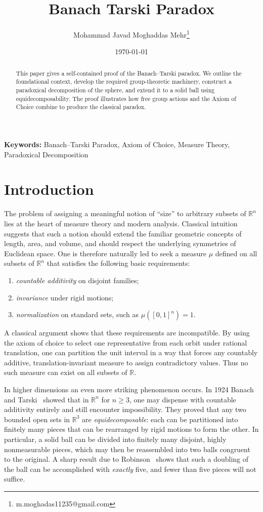 \documentclass[12pt,a4paper]{article}
\title{Banach Tarski Paradox}
\author{
  Mohammad Javad Moghaddas Mehr\thanks{m.moghadas11235@gmail.com}}
\date{\today}
\theoremstyle{spaced}
\begin{document}
\maketitle
\vspace{5em}
\begin{abstract}
	This paper gives a self-contained proof of the Banach--Tarski paradox. We outline the foundational context, develop the required group-theoretic machinery, construct a paradoxical decomposition of the sphere, and extend it to a solid ball using equidecomposability. The proof illustrates how free group actions and the Axiom of Choice combine to produce the classical paradox.
\end{abstract}

\small{\textbf{Keywords:} Banach–Tarski Paradox, Axiom of Choice, Measure Theory, Paradoxical Decomposition}


\section{Introduction}

The problem of assigning a meaningful notion of ``size'' to arbitrary subsets of
$\mathbb{R}^n$ lies at the heart of measure theory and modern analysis. Classical
intuition suggests that such a notion should extend the familiar geometric
concepts of length, area, and volume, and should respect the underlying
symmetries of Euclidean space. One is therefore naturally led to seek a measure
$\mu$ defined on all subsets of $\mathbb{R}^n$ that satisfies the following basic
requirements:
\begin{enumerate}
	\item \emph{countable additivity} on disjoint families;
	\item \emph{invariance} under rigid motions;
	\item \emph{normalization} on standard sets, such as $\mu([0,1]^n)=1$.
\end{enumerate}

A classical argument shows that these requirements are incompatible.
By using the axiom of choice to select one representative from each orbit under
rational translation, one can partition the unit interval in a way that forces any
countably additive, translation-invariant measure to assign contradictory values.
Thus no such measure can exist on all subsets of $\mathbb{R}$.

In higher dimensions an even more striking phenomenon occurs. In 1924 Banach and
Tarski~\cite{banach1924decomposition} showed that in $\mathbb{R}^n$ for $n\ge 3$,
one may dispense with countable additivity entirely and still encounter
impossibility. They proved that any two bounded open sets in $\mathbb{R}^3$ are
\emph{equidecomposable}: each can be partitioned into finitely many pieces that
can be rearranged by rigid motions to form the other. In particular, a solid
ball can be divided into finitely many disjoint, highly nonmeasurable pieces,
which may then be reassembled into two balls congruent to the original. A sharp
result due to Robinson~\cite{robinson1947decomposition} shows that such a
doubling of the ball can be accomplished with \emph{exactly} five, and fewer than five pieces will not suffice.
\end{document}
